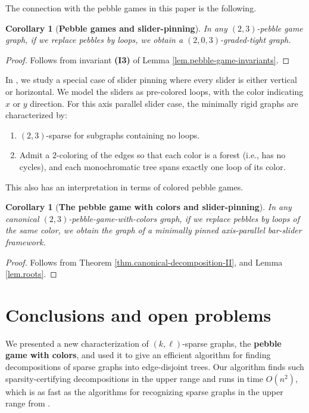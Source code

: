 \documentclass[Svgc,nospthms]{Svgc}
\newtheorem{corollary}[theorem]{Corollary}
\newcommand{\reflem}[1]{Lemma \ref{lem.#1}}
\newcommand{\refthm}[1]{Theorem \ref{thm.#1}}
\begin{document}
	The connection with the pebble games in this paper is the following.
	\begin{corollary}[{\bf Pebble games and slider-pinning}]
		In any $(2,3)$-pebble game graph, if we replace pebbles by loops, 
		we obtain a  $(2,0,3)$-graded-tight graph.
	\end{corollary}
	\begin{proof}
		Follows from invariant {\bf (I3)} of \reflem{pebble-game-invariants}.
	\end{proof}
	
	In \cite{sliders}, we study a special case of slider
	pinning where every slider is either vertical or horizontal.  We model the sliders 
	as pre-colored loops, with the color indicating $x$ or
	$y$ direction.  For this axis parallel slider case, the minimally rigid graphs are 
	characterized by:
	\begin{enumerate}
		\item $(2,3)$-sparse for subgraphs containing no loops.
		\item Admit a $2$-coloring of the edges so that each color is a forest
		(i.e., has no cycles),
		and each monochromatic tree spans exactly one loop of its color.
	\end{enumerate}
	
	This also has an interpretation in terms of colored pebble games.
	\begin{corollary}[{\bf The pebble game with colors and slider-pinning}]
		In any canonical $(2,3)$-pebble-game-with-colors graph, if we replace pebbles by loops
		of the same color, we obtain the graph of a minimally pinned axis-parallel bar-slider 
		framework.
	\end{corollary}
	\begin{proof}
		Follows from \refthm{canonical-decomposition-II}, and \reflem{roots}.
	\end{proof}

	\section{Conclusions and open problems}
	We presented a new characterization of $(k,\ell)$-sparse graphs, the 
	\textbf{pebble game with colors}, and
	used it to give an efficient algorithm for finding decompositions of sparse 
	graphs into edge-disjoint trees.  Our algorithm finds such sparsity-certifying 
	decompositions in the upper range and 
	runs in time $O(n^2)$, which 
	is as fast as the algorithms for recognizing sparse graphs in the upper range 
	from \cite{pebblegame}.
\end{document}
